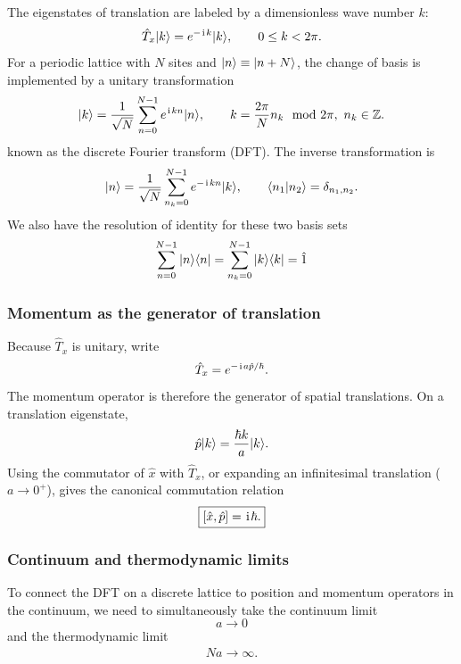 The eigenstates of translation are labeled by a dimensionless wave number
$k$:
\begin{equation}
 \hat{T}_x|{k}\rangle=e^{-\hspace{1pt}\mathrm{i}\hspace{1pt} k}|{k}\rangle,
 \qquad 0\leq k<2\pi.
\end{equation}
For a periodic lattice with $N$ sites and $|{n}\rangle\equiv|{n+N}\rangle$, the change of basis is implemented by a unitary transformation
\begin{equation}
 |{k}\rangle=\frac{1}{\sqrt{N}}\sum_{n=0}^{N-1} e^{\hspace{1pt}\mathrm{i}\hspace{1pt} kn}|{n}\rangle,
 \qquad
 k=\frac{2\pi}{N}n_k\mod2\pi,~n_k\in{\mathbb{Z}}.
\end{equation}
known as the discrete Fourier transform (DFT). The inverse transformation is
\begin{equation}
 |{n}\rangle=\frac{1}{\sqrt{N}}\sum_{n_k=0}^{N-1} e^{-\hspace{1pt}\mathrm{i}\hspace{1pt} kn}|{k}\rangle,
 \qquad
 \langle{n_1|n_2}\rangle=\delta_{n_1,n_2}.
\end{equation}
We also have the resolution of identity for these two basis sets
\begin{align}\label{resolution of identity:discrete}
    \sum_{n=0}^{N-1}|n\rangle\langle n|=\sum_{n_k=0}^{N-1}|k\rangle\langle k|=\hat1
\end{align}


\subsubsection{Momentum as the generator of translation}
Because $\hat{T}_x$ is unitary, write
\begin{equation}
 \hat{T}_x=e^{-\hspace{1pt}\mathrm{i}\hspace{1pt} a\hat{p}/\hbar}.
\end{equation}
The momentum operator is therefore the generator of spatial translations.
On a translation eigenstate,
\begin{equation}
 \hat{p}|{k}\rangle=\frac{\hbar k}{a}|{k}\rangle.
\end{equation}
Using the commutator of $\hat{x}$ with $\hat{T}_x$, or expanding an
infinitesimal translation ($a\rightarrow0^+$), gives the canonical commutation relation
\begin{equation}
 \boxed{\left[\hat{x},\hat{p}\right]=\hspace{1pt}\mathrm{i}\hspace{1pt}\hbar.}
\end{equation}

\subsubsection{Continuum and thermodynamic limits}
To connect the DFT on a discrete lattice to position and momentum operators in the continuum, we need to simultaneously take the continuum limit
\begin{equation}
 a\longrightarrow0
\end{equation}
and the thermodynamic limit
\begin{align}
    Na\longrightarrow\infty.
\end{align}
 

